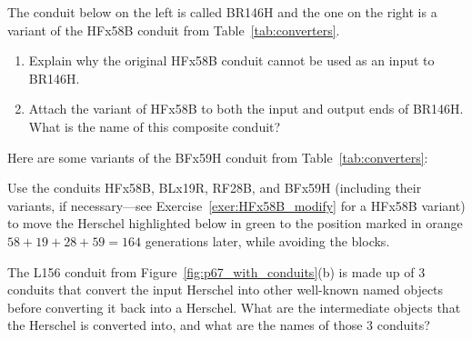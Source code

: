 \begin{multicols}{2}
	
	\mfilbreak
	
	
	\begin{problem}\label{exer:HFx58B_modify}
		The conduit below on the left is called BR146H and the one on the right is a variant of the HFx58B conduit from Table~\ref{tab:converters}.
		
		\begin{center}
			 \qquad {}
		\end{center}
		
		\begin{enumerate}[label=\bf\color{ocre}(\alph*)]
			\item Explain why the original HFx58B conduit cannot be used as an input to BR146H.
			
			\item Attach the variant of HFx58B to both the input and output ends of BR146H. What is the name of this composite conduit?
		\end{enumerate}
	\end{problem}
	
	
	\mfilbreak
	
	
	\begin{problem}\label{exer:herschel_variants}
		Here are some variants of the BFx59H conduit from Table~\ref{tab:converters}:
		\begin{center}
		\end{center}
		Use the conduits HFx58B, BLx19R, RF28B, and BFx59H (including their variants, if necessary---see Exercise~\ref{exer:HFx58B_modify} for a HFx58B variant) to move the Herschel highlighted below in green to the position marked in orange $58+19+28+59=164$ generations later, while avoiding the blocks.	
		\begin{center}
		\end{center}
	\end{problem}
	
	
	\mfilbreak
	
	
	\begin{problem}\label{exer:l156_break_apart}
		The L156 conduit from Figure~\ref{fig:p67_with_conduits}(b) is made up of $3$ conduits that convert the input Herschel into other well-known named objects before converting it back into a Herschel. What are the intermediate objects that the Herschel is converted into, and what are the names of those $3$ conduits?
	\end{problem}
	

\end{multicols}
